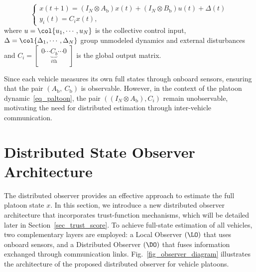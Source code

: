 \begin{equation}\label{eq_paltoon}
      \left\{ \begin{array}{l}
      x(t+1) = (I_N \otimes A_{\text{b}}) x(t) + (I_N \otimes B_{\text{b}}) u(t) + \Delta (t)\\
      y_i(t) = C_i x(t),
      \end{array}\right.
\end{equation}
where $u = \col{u_{1}, \cdots , u_{N}}$ is the collective control input, $\Delta = \col{\Delta_1, \cdots, \Delta_N}$ group unmodeled dynamics and external disturbances 
and $C_i = \begin{bmatrix}0 \cdots \underbrace{C_{b}}_{i\text{th}} \cdots 0\end{bmatrix}$ is the global output matrix.

Since each vehicle measures its own full states through onboard sensors, ensuring that the pair $(A_{\text{b}},\ C_{\text{b}})$ is observable.
However, in the context of the platoon dynamic~\eqref{eq_paltoon}, the pair $((I_N \otimes A_{\text{b}}), C_i)$ remain unobservable, motivating the need for distributed estimation through inter-vehicle communication.




\section{Distributed State Observer Architecture}\label{sec_Distributed Observer}
The distributed observer provides an effective approach to estimate the full platoon state $x$. 
In this section, we introduce a new distributed observer architecture that incorporates trust-function mechanisms, 
which will be detailed later in Section~\ref{sec_trust_score}. 
To achieve full-state estimation of all vehicles, 
two complementary layers are employed: 
a Local Observer $(\LO)$ that uses onboard sensors, and a Distributed Observer $(\DO)$ that fuses information exchanged through communication links.
Fig.~\ref{fig_observer_diagram} illustrates the architecture of the proposed distributed observer for vehicle platoons.  

